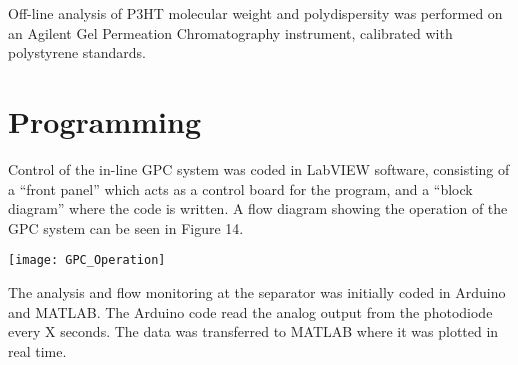 Off-line analysis of P3HT molecular weight and polydispersity was performed on an Agilent Gel Permeation Chromatography instrument, calibrated with polystyrene standards. 

\section{Programming}

Control of the in-line GPC system was coded in LabVIEW software, consisting of a “front panel” which acts as a control board for the program, and a “block diagram” where the code is written. A flow diagram showing the operation of the GPC system can be seen in Figure 14. 

\texttt{[image: GPC\_Operation]}

The analysis and flow monitoring at the separator was initially coded in Arduino and MATLAB. The Arduino code read the analog output from the photodiode every X seconds. The data was transferred to MATLAB where it was plotted in real time. 

